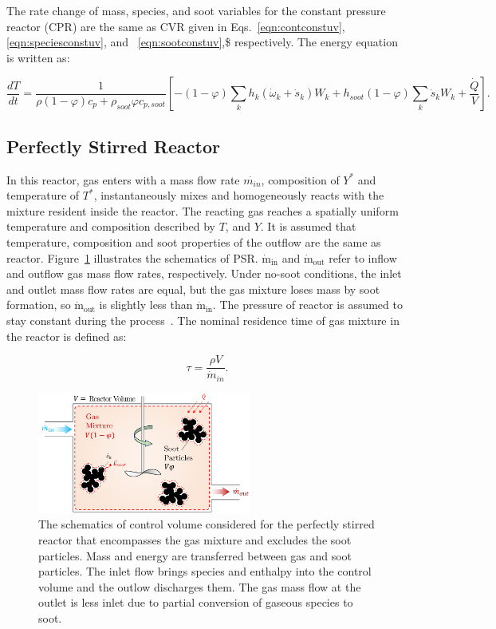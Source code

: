 The rate change of mass, species, and soot variables for the constant pressure reactor (CPR) are the same as CVR given in Eqs.~\ref{eqn:contconstuv}, \ref{eqn:speciesconstuv}, and ~\ref{eqn:sootconstuv},\$ respectively. The energy equation is written as:

\begin{equation}
	\frac{d T}{d t}=
	\frac{1}{\rho (1-\varphi) c_p+\rho_{soot}\varphi c_{p,soot}}
	\left[
	-(1-\varphi)\sum_k h_k
	\left(
	\dot{\omega}_k+\dot{s}_k
	\right) W_k
	+h_{soot}(1-\varphi)\sum_k \dot{s}_k W_k
	+\frac{\dot{Q}}{V}
	\right]
	\label{eqn:energypressure}.
\end{equation}

\subsection{Perfectly Stirred Reactor}
In this reactor, gas enters with a mass flow rate $\dot{m_{in}}$, composition of $Y^\ast$ and temperature of $T^\ast$, instantaneously mixes and homogeneously reacts with the mixture resident inside the reactor. The reacting gas reaches a spatially uniform temperature and composition described by $T$, and $Y$. It is assumed that temperature, composition and soot properties of the outflow are the same as reactor. Figure~\ref{fig:psrcv} illustrates the schematics of PSR. $\mathrm{\dot{m}_{in}}$ and $\mathrm{\dot{m}_{out}}$ refer to inflow and outflow gas mass flow rates, respectively. Under no-soot conditions, the inlet and outlet mass flow rates are equal, but the gas mixture loses mass by soot formation, so $\mathrm{\dot{m}_{out}}$ is slightly less than $\mathrm{\dot{m}_{in}}$. The pressure of reactor is assumed to stay constant during the process~\citep{kee2017chemically}. The nominal residence time of gas mixture in the reactor is defined as:

\begin{equation}
	\tau = \frac{\rho V}{\dot{m}_{in}}
	\label{eqn:taupsr}.
\end{equation} 

 

\begin{figure}[!htbp]
	\centering
	\includegraphics[height=40mm, ]{Figures/Theory/PSR.pdf}
	\caption{The schematics of control volume considered for the perfectly stirred reactor that encompasses the gas mixture and excludes the soot particles. Mass and energy are transferred between gas and soot particles. The inlet flow brings species and enthalpy into the control volume and the outlow discharges them. The gas mass flow at the outlet is less inlet due to partial conversion of gaseous species to soot.}
	\label{fig:psrcv}
\end{figure}

